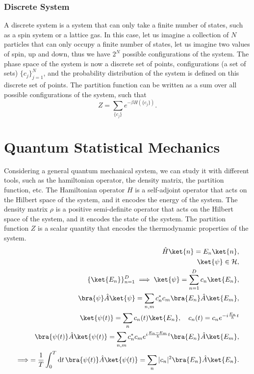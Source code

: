 \subsubsection{Discrete System}

A discrete system is a system that can only take a finite number of states, such as a spin system or a lattice gas. In this case, let us imagine a collection of \(N\) particles that can only occupy a finite number of states, let us imagine two values of spin, up and down, thus we have \(2^N\) possible configurations of the system. The phase space of the system is now a discrete set of points, configurations (a set of sets) \(\{c_j\}_{j=1}^N\), and the probability distribution of the system is defined on this discrete set of points. The partition function can be written as a sum over all possible configurations of the system, such that
\[
    Z = \sum_{\{c_j\}} e^{-\beta H(\{c_j\})}.
\]

\section{Quantum Statistical Mechanics}

Considering a general quantum mechanical system, we can study it with different tools, such as the hamiltonian operator, the density matrix, the partition function, etc. The Hamiltonian operator \(H\) is a self-adjoint operator that acts on the Hilbert space of the system, and it encodes the energy of the system. The density matrix \(\rho\) is a positive semi-definite operator that acts on the Hilbert space of the system, and it encodes the state of the system. The partition function \(Z\) is a scalar quantity that encodes the thermodynamic properties of the system.
\[
    \begin{aligned}
        \hat{H} \ket{n} = E_n \ket{n},                                                                                          \\
        \ket{\psi} \in \mathcal{H},                                                                                             \\
        \{\ket{E_n}\}_{n=1}^D \implies \ket{\psi} = \sum_{n=1}^D c_n \ket{E_n},                                                 \\
        \bra{\psi} \hat{A} \ket{\psi} = \sum_{n,m} c_n^* c_m \bra{E_n} \hat{A} \ket{E_m},                                       \\
        \ket{\psi(t)} = \sum_{n} c_n(t) \ket{E_n}, \quad c_n(t) = c_n e^{-i \frac{E_n}{\hbar} t}                                \\
        \bra{\psi(t)} \hat{A} \ket{\psi(t)} = \sum_{n,m} c_n^* c_m e^{i \frac{E_n - E_m}{\hbar} t} \bra{E_n} \hat{A} \ket{E_m}, \\
        \implies = \frac{1}{T} \int_0^T \mathrm{d}t \, \bra{\psi(t)} \hat{A} \ket{\psi(t)} = \sum_{n} |c_n|^2 \bra{E_n} \hat{A} \ket{E_n}.
    \end{aligned}
\]

